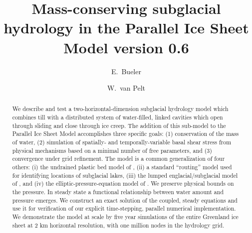\documentclass[gmd]{copernicus}   %
\begin{document}
\graphicspath{{figszip/}}

\title{Mass-conserving subglacial hydrology in the Parallel Ice Sheet Model version 0.6}

\author[1]{E.~Bueler}
\author[2]{W.~{van} Pelt}




\received{}
\pubdiscuss{} %
\revised{}
\accepted{}
\published{}


\maketitle

\linenumbers

\begin{abstract}
We describe and test a two-horizontal-dimension subglacial hydrology model which combines till with a distributed system of water-filled, linked cavities which open through sliding and close through ice creep.  The addition of this sub-model to the Parallel Ice Sheet Model accomplishes three specific goals: (1) conservation of the mass of water, (2) simulation of spatially- and temporally-variable basal shear stress from physical mechanisms based on a minimal number of free parameters, and (3) convergence under grid refinement.  The model is a common generalization of four others: (i) the undrained plastic bed model of \cite{Tulaczyketal2000b}, (ii) a standard ``routing'' model used for identifying locations of subglacial lakes, (iii) the lumped englacial/subglacial model of \cite{Bartholomausetal2011}, and (iv) the elliptic-pressure-equation model of \cite{Schoofetal2012}.  We preserve physical bounds on the pressure.  In steady state a functional relationship between water amount and pressure emerges.  We construct an exact solution of the coupled, steady equations and use it for verification of our explicit time-stepping, parallel numerical implementation.  We demonstrate the model at scale by five year simulations of the entire Greenland ice sheet at 2 km horizontal resolution, with one million nodes in the hydrology grid.
\end{abstract}
\end{document}
